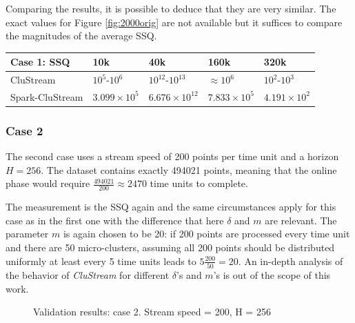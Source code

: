 \documentclass[10pt, conference, compsocconf]{IEEEtran}
\begin{document}
Comparing the results, it is possible to deduce that they are very similar. The exact values for Figure \ref{fig:2000orig} are not available but it suffices to compare the magnitudes of the average SSQ. 

\begin{center}
\begin{tabular}{|l|l|l|l|l|}\hline
\textbf{Case 1: SSQ} & \textbf{10k} & \textbf{40k} & \textbf{160k} & \textbf{320k}\\\hline
CluStream & $10^5$-$10^6$ & $10^{12}$-$10^{13}$ & $\approx 10^6$ & $10^2$-$10^3$\\\hline
Spark-CluStream & $3.099\times10^5$ & $6.676\times10^{12}$ & $7.833\times10^5$ & $4.191\times10^2$\\\hline
\end{tabular}
\end{center}



\subsubsection{Case 2}

The second case uses a stream speed of 200 points per time unit and a horizon $H=256$. The dataset contains exactly 494021 points, meaning that the online phase would require $\frac{494021}{200} \approx 2470$ time units to complete.

The measurement is the SSQ again and the same circumstances apply for this case as in the first one with the difference that here $\delta$ and $m$ are relevant. The parameter $m$ is again chosen to be 20: if 200 points are processed every time unit and there are 50 micro-clusters, assuming all 200 points should be distributed uniformly at least every 5 time units leads to $5\frac{200}{50}=20$. An in-depth analysis of the behavior of \textit{CluStream} for different $\delta$'s and $m$'s is out of the scope of this work. 


\begin{figure}[h]
\hfill
{}
\hfill
{}
\hfill
\caption{Validation results: case 2. Stream speed = 200, H = 256}
\label{fig:200h256}
\end{figure}
\end{document}
